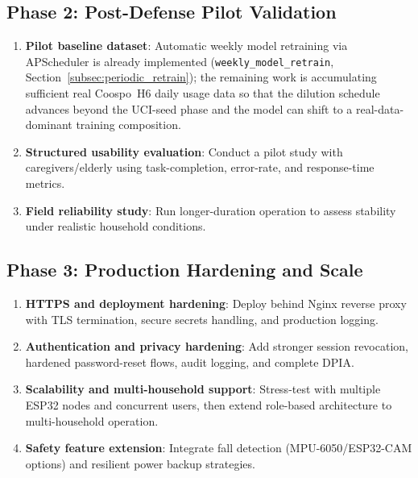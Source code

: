 \subsection*{Phase 2: Post-Defense Pilot Validation}
\begin{enumerate}
 \item \textbf{Pilot baseline dataset}: Automatic weekly model retraining via APScheduler is already implemented (\texttt{weekly\_model\_retrain}, Section~\ref{subsec:periodic_retrain}); the remaining work is accumulating sufficient real Coospo~H6 daily usage data so that the dilution schedule advances beyond the UCI-seed phase and the model can shift to a real-data-dominant training composition.

 \item \textbf{Structured usability evaluation}: Conduct a pilot study with caregivers/elderly using task-completion, error-rate, and response-time metrics.

 \item \textbf{Field reliability study}: Run longer-duration operation to assess stability under realistic household conditions.
\end{enumerate}

\subsection*{Phase 3: Production Hardening and Scale}
\begin{enumerate}
    \item \textbf{HTTPS and deployment hardening}: Deploy behind Nginx reverse
    proxy with TLS termination, secure secrets handling, and production logging.
    \item \textbf{Authentication and privacy hardening}: Add stronger session
    revocation, hardened password-reset flows, audit logging, and complete DPIA.
    \item \textbf{Scalability and multi-household support}: Stress-test with
    multiple ESP32 nodes and concurrent users, then extend role-based
    architecture to multi-household operation.
    \item \textbf{Safety feature extension}: Integrate fall detection
    (MPU-6050/ESP32-CAM options) and resilient power backup strategies.
\end{enumerate}